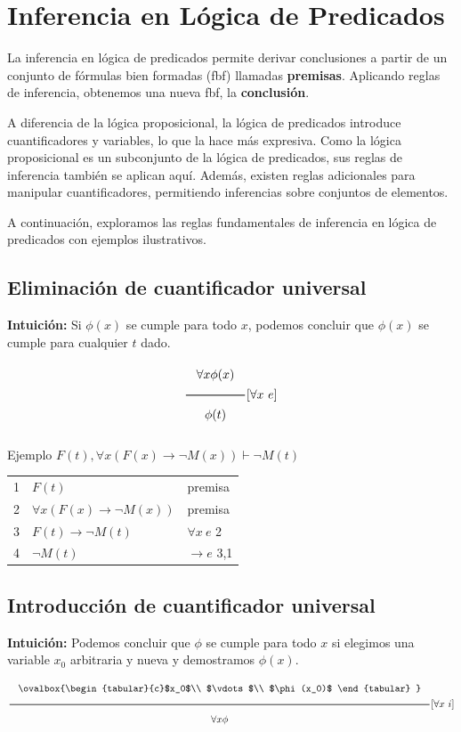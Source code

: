 \section{Inferencia en Lógica de Predicados}

La inferencia en lógica de predicados permite derivar conclusiones a partir de un conjunto de fórmulas bien formadas (fbf) llamadas \textbf{premisas}. Aplicando reglas de inferencia, obtenemos una nueva fbf, la \textbf{conclusión}.

A diferencia de la lógica proposicional, la lógica de predicados introduce cuantificadores y variables, lo que la hace más expresiva. Como la lógica proposicional es un subconjunto de la lógica de predicados, sus reglas de inferencia también se aplican aquí. Además, existen reglas adicionales para manipular cuantificadores, permitiendo inferencias sobre conjuntos de elementos.

A continuación, exploramos las reglas fundamentales de inferencia en lógica de predicados con ejemplos ilustrativos.


\subsection{Eliminación de cuantificador universal}

\textbf{Intuición:} Si $\phi (x)$ se cumple para todo $x$, podemos concluir que $\phi (x)$ se cumple para cualquier $t$ dado.
\[
\Rulee{\forall x \phi (x)}{\phi(t)}{\forall x\ e}
\]

\begin{exampleblock}{Ejemplo}
$F(\textit{t}), \forall x ( F(x) \rightarrow \neg M(x)) \vdash \neg M(\textit{t})$
\end{exampleblock}

\begin{tabular}{p{4mm}p{60mm}p{40mm}}
1 & $F(\textit{t})$ & premisa \\
2 & $\forall x ( F(x) \rightarrow \neg M(x))$ & premisa \\
3 & $F(\textit{t}) \rightarrow \neg M(\textit{t})$ & $\forall x\ e$ 2\\
4 & $\neg M(\textit{t})$ & $\rightarrow e$ 3,1
\end{tabular}

\subsection{Introducción de cuantificador universal}

\textbf{Intuición:} Podemos concluir que $\phi$ se cumple para todo $x$ si elegimos una variable $x_0$ arbitraria y nueva y demostramos $\phi(x)$.
\[
\Rulee{\ovalbox{\begin{tabular}{c}$x_0$\\  $\vdots$\\  $\phi(x_0)$
                \end{tabular}
               }}{\forall x \phi}{\forall x\ i}
\]

